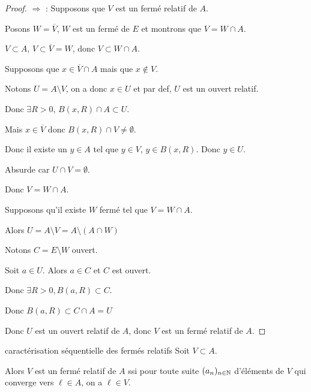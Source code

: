 \begin{proof}
    $\Rightarrow$ : Supposons que $V$ est un fermé relatif de $A$.

    Posons $W = \overline{V}$, $W$ est un fermé de $E$ et montrons que $V = W \cap A$.

    $V \subset A$, $V \subset \overline V = W$, donc $V \subset W \cap A$.

    Supposons que $x \in \overline V \cap A$ mais que $x \not \in V$.

    Notons $U = A \setminus V$, on a donc $x \in U$ et par def, $U$ est un ouvert relatif. 

    Donc $\exists R > 0, \, B(x, R) \cap A \subset U$.

    Mais $x \in  \overline V$ donc $B(x, R) \cap V \neq \emptyset$.

    Donc il existe un $y \in A$ tel que $y \in V$, $y \in B(x, R)$. Donc $y \in U$.

    Absurde car $U \cap V = \emptyset$.

    Donc $V = W \cap A$.


    Supposons qu'il existe $W$ fermé tel que $V = W \cap A$. 

    Alors $U = A \setminus V = A \setminus (A \cap W)$

    Notons $C = E \setminus W$ ouvert.

    Soit $a \in U$. Alors $a \in C$ et $C$ est ouvert. 

    Donc $\exists R > 0, B(a, R) \subset C$.

    Donc $B(a, R) \subset C \cap A = U$ 

    Donc $U$ est un ouvert relatif de $A$, donc $V$ est un fermé relatif de $A$.
\end{proof}


\begin{proposition}{caractérisation séquentielle des fermés relatifs}{}
    Soit $V \subset A$. 

    Alors $V$ est un fermé relatif de $A$ ssi pour toute suite $(a_n)_{n \in \mathbb{N}}$ d'éléments de $V$
    qui converge vers $\ell \in A$, on a $\ell \in V$.
    
\end{proposition}


